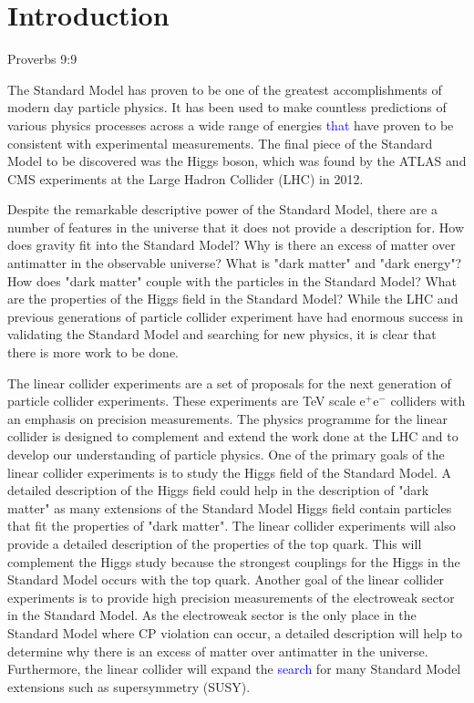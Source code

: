 \chapter{Introduction}
\label{chap:introduction}

{Proverbs 9:9}


The Standard Model has proven to be one of the greatest accomplishments of modern day particle physics.  It has been used to make countless predictions of various physics processes across a wide range of energies \textcolor{blue}{that} have proven to be consistent with experimental measurements.  The final piece of the Standard Model to be discovered was the Higgs boson, which was found by the ATLAS \cite{Aad:2012tfa} and CMS \cite{Chatrchyan:2012xdj} experiments at the Large Hadron Collider (LHC) in 2012.  

Despite the remarkable descriptive power of the Standard Model, there are a number of features in the universe that it does not provide a description for.  How does gravity fit into the Standard Model?  Why is there an excess of matter over antimatter in the observable universe?  What is "dark matter" and "dark energy"?  How does "dark matter" couple with the particles in the Standard Model?  What are the properties of the Higgs field in the Standard Model?  While the LHC and previous generations of particle collider experiment have had enormous success in validating the Standard Model and searching for new physics, it is clear that there is more work to be done. 

The linear collider experiments are a set of proposals for the next generation of particle collider experiments.  These experiments are TeV scale $\text{e}^{+}\text{e}^{-}$ colliders with an emphasis on precision measurements.  The physics programme for the linear collider is designed to complement and extend the work done at the LHC and to develop our understanding of particle physics.  One of the primary goals of the linear collider experiments is to study the Higgs field of the Standard Model.  A detailed description of the Higgs field could help in the description of "dark matter" as many extensions of the Standard Model Higgs field contain particles that fit the properties of "dark matter".  The linear collider experiments will also provide a detailed description of the properties of the top quark.  This will complement the Higgs study because the strongest couplings for the Higgs in the Standard Model occurs with the top quark.  Another goal of the linear collider experiments is to provide high precision measurements of the electroweak sector in the Standard Model.  As the electroweak sector is the only place in the Standard Model where CP violation can occur, a detailed description will help to determine why there is an excess of matter over antimatter in the universe.  Furthermore, the linear collider will expand the \textcolor{blue}{search} for many Standard Model extensions such as supersymmetry (SUSY).

